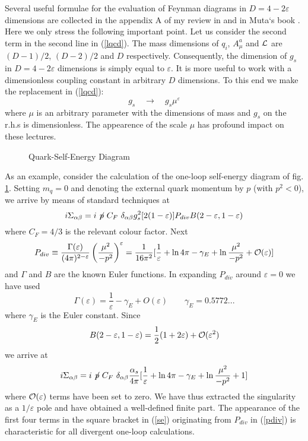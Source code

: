 \documentclass[12pt]{article}
\newcommand{\be}{\begin{equation}}
\newcommand{\ee}{\end{equation}}
\newcommand{\ord}{{\cal O}}
\begin{document}
\begin{itemize}
Several useful formulae for the evaluation of Feynman diagrams in
$D=4-2\varepsilon$ dimensions 
are collected in the appendix A of my review in \cite{AB80} and
in Muta`s book \cite{MUTA}. Here we only
stress the following important point. Let us consider the second
term in the second line in (\ref{lqcd}). The mass dimensions of
$q_i$, $A^a_\mu$ and ${\cal L}$ are $(D-1)/2$, $(D-2)/2$ and $D$
respectively. Consequently, the dimension of $g_s$ in $D=4-2\varepsilon$
dimensions is simply equal to $\varepsilon$. 
It is more useful to work with a
 dimensionless coupling constant in arbitrary $D$ dimensions. To this
end  we make the replacement in (\ref{lqcd}):
\be
g_s\quad \to \quad g_s \mu^\varepsilon
\ee
where $\mu$ is an arbitrary parameter with the dimensions of mass
and $g_s$ on the r.h.s is dimensionless. The appearence of the
scale $\mu$ has profound impact on these lectures.

\begin{figure}[hbt]
\vspace{0.10in}
\centerline{
\epsfysize=1in
}%
\vspace{0.08in}
\caption[]{Quark-Self-Energy Diagram 
\label{L:3}}
\end{figure}

As an example, consider the calculation of the one-loop self-energy
diagram of fig. \ref{L:3}. Setting
$m_q=0$ and denoting the external quark momentum by $p$ (with $p^2<0$), 
we arrive
by means of standard techniques at
\begin{equation}\label{isigma}
i \Sigma_{\alpha\beta}=i\not\! p~ C_F~ \delta_{\alpha\beta}
g^2_s [2 (1-\varepsilon)] P_{div} B(2-\varepsilon,1-\varepsilon)
\end{equation}
where $C_F=4/3$ is the relevant colour factor. Next
\begin{equation}\label{pdiv}
P_{div}\equiv \frac{\Gamma(\varepsilon)}{(4\pi)^{2-\varepsilon}}
\left(\frac{\mu^2}{-p^2}\right)^\varepsilon
=\frac{1}{16\pi^2}
\lbrack \frac{1}{\varepsilon}+\ln 4\pi-\gamma_E+\ln\frac{\mu^2}{-p^2}
+\ord(\varepsilon)
\rbrack
\end{equation}
and $\Gamma$ and $B$ are the known Euler functions. In expanding
$P_{div}$ around $\varepsilon=0$ we have used
\be
\Gamma(\varepsilon)=\frac{1}{\varepsilon}-\gamma_E+O(\varepsilon)
\qquad
\gamma_E=0.5772...
\ee
where $\gamma_E$ is the Euler constant. Since
\be
B(2-\varepsilon,1-\varepsilon)=\frac{1}{2}(1+2\varepsilon)+
\ord(\varepsilon^2)
\ee 
we arrive at
\begin{equation}\label{se}
i \Sigma_{\alpha\beta}=i\not\! p~ C_F~ \delta_{\alpha\beta}
\frac{\alpha_s}{4\pi}
\lbrack \frac{1}{\varepsilon}+\ln 4\pi-\gamma_E+\ln\frac{\mu^2}{-p^2}+1
\rbrack
\end{equation}
where $\ord(\varepsilon)$ terms have been set to zero.
We have thus extracted the singularity as a $1/\varepsilon$ pole
and have obtained a well-defined finite part. The appearance
of the first four terms
in the square bracket in (\ref{se}) originating from $P_{div}$ in
(\ref{pdiv}) is characteristic for all divergent one-loop calculations.


\end{itemize}
\end{document}
